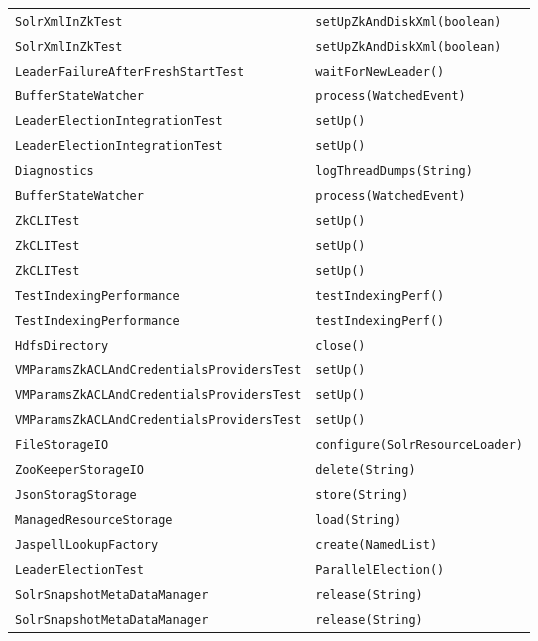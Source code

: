 \begin{center}
\begin{longtable}{ll}
\lstinline/SolrXmlInZkTest/&{\lstinline/setUpZkAndDiskXml(boolean)/}\\
\lstinline/SolrXmlInZkTest/&{\lstinline/setUpZkAndDiskXml(boolean)/}\\
\lstinline/LeaderFailureAfterFreshStartTest/&{\lstinline/waitForNewLeader()/}\\
\lstinline/BufferStateWatcher/&{\lstinline/process(WatchedEvent)/}\\
\lstinline/LeaderElectionIntegrationTest/&{\lstinline/setUp()/}\\
\lstinline/LeaderElectionIntegrationTest/&{\lstinline/setUp()/}\\
\lstinline/Diagnostics/&{\lstinline/logThreadDumps(String)/}\\
\lstinline/BufferStateWatcher/&{\lstinline/process(WatchedEvent)/}\\
\lstinline/ZkCLITest/&{\lstinline/setUp()/}\\
\lstinline/ZkCLITest/&{\lstinline/setUp()/}\\
\lstinline/ZkCLITest/&{\lstinline/setUp()/}\\
\lstinline/TestIndexingPerformance/&{\lstinline/testIndexingPerf()/}\\
\lstinline/TestIndexingPerformance/&{\lstinline/testIndexingPerf()/}\\
\lstinline/HdfsDirectory/&{\lstinline/close()/}\\
\lstinline/VMParamsZkACLAndCredentialsProvidersTest/&{\lstinline/setUp()/}\\
\lstinline/VMParamsZkACLAndCredentialsProvidersTest/&{\lstinline/setUp()/}\\
\lstinline/VMParamsZkACLAndCredentialsProvidersTest/&{\lstinline/setUp()/}\\
\lstinline/FileStorageIO/&{\lstinline/configure(SolrResourceLoader)/}\\
\lstinline/ZooKeeperStorageIO/&{\lstinline/delete(String)/}\\
\lstinline/JsonStoragStorage/&{\lstinline/store(String)/}\\
\lstinline/ManagedResourceStorage/&{\lstinline/load(String)/}\\
\lstinline/JaspellLookupFactory/&{\lstinline/create(NamedList)/}\\
\lstinline/LeaderElectionTest/&{\lstinline/ParallelElection()/}\\
\lstinline/SolrSnapshotMetaDataManager/&{\lstinline/release(String)/}\\
\lstinline/SolrSnapshotMetaDataManager/&{\lstinline/release(String)/}\\

\end{longtable}
\end{center}
